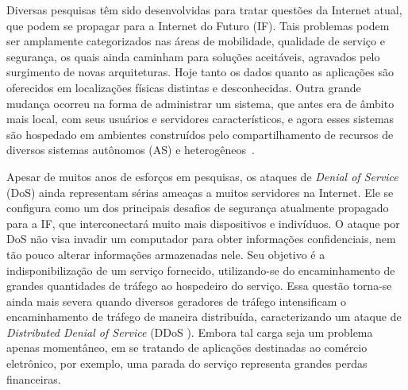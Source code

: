 
Diversas pesquisas têm sido desenvolvidas para tratar questões da Internet atual, que podem se propagar para a Internet do Futuro (IF). Tais problemas podem ser amplamente categorizados nas áreas de mobilidade, qualidade de serviço e segurança, os quais ainda caminham para soluções aceitáveis, agravados pelo surgimento de novas arquiteturas. Hoje tanto os dados quanto as aplicações são oferecidos em localizações físicas distintas e desconhecidas. Outra grande mudança ocorreu na forma de administrar um sistema, que antes era de âmbito mais local, com seus usuários e servidores característicos, e agora esses sistemas são hospedado em ambientes construídos pelo compartilhamento de recursos de diversos sistemas autônomos (AS) e heterogêneos~\cite{5486552}.


Apesar de muitos anos de esforços em pesquisas, os ataques de \emph{Denial of Service} (DoS) ainda representam sérias ameaças a muitos servidores na Internet.  Ele se configura como um dos principais desafios de segurança atualmente propagado para a IF, que interconectará muito mais dispositivos e indivíduos.  %
O ataque por DoS não visa invadir um computador para obter informações confidenciais, nem tão pouco alterar informações armazenadas nele. Seu objetivo é a indisponibilização de um serviço fornecido, utilizando-se do encaminhamento de grandes quantidades de tráfego ao hospedeiro do serviço. %
Essa questão torna-se ainda mais severa quando diversos geradores de tráfego intensificam o encaminhamento de tráfego de maneira distribuída, caracterizando um ataque de \emph{Distributed Denial of Service} (DDoS \cite{Sachdeva08ddosincidents}). 
%
Embora tal carga seja um problema apenas momentâneo, em se tratando de aplicações destinadas ao comércio eletrônico, por exemplo, uma parada do serviço representa grandes perdas financeiras. 

